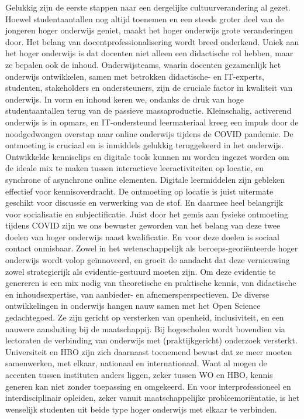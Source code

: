 \documentclass{jote-book}
\begin{document}
	Gelukkig zijn de eerste stappen naar een dergelijke cultuurverandering al gezet. Hoewel studentaantallen nog altijd toenemen en een steeds groter deel van de jongeren hoger onderwijs geniet, maakt het hoger onderwijs grote veranderingen door. Het belang van docentprofessionalisering wordt breed onderkend. Uniek aan het hoger onderwijs is dat docenten niet alleen een didactische rol hebben, maar ze bepalen ook de inhoud. Onderwijsteams, waarin docenten gezamenlijk het onderwijs ontwikkelen, samen met betrokken didactische- en IT-experts, studenten, stakeholders en ondersteuners, zijn de cruciale factor in kwaliteit van onderwijs. In vorm en inhoud keren we, ondanks de druk van hoge studentaantallen terug van de passieve massaproductie. Kleinschalig, activerend onderwijs is in opmars, en IT-ondersteund leermateriaal kreeg een impuls door de noodgedwongen overstap naar online onderwijs tijdens de COVID pandemie. De ontmoeting is cruciaal en is inmiddels gelukkig teruggekeerd in het onderwijs. Ontwikkelde kennisclips en digitale tools kunnen nu worden ingezet worden om de ideale mix te maken tussen interactieve leeractiviteiten op locatie, en synchrone of asynchrone online elementen. Digitale leermiddelen zijn gebleken effectief voor kennisoverdracht. De ontmoeting op locatie is juist uitermate geschikt voor discussie en verwerking van de stof. En daarmee heel belangrijk voor socialisatie en subjectificatie. Juist door het gemis aan fysieke ontmoeting tijdens COVID zijn we ons bewuster geworden van het belang van deze twee doelen van hoger onderwijs naast kwalificatie. En voor deze doelen is sociaal contact onmisbaar. Zowel in het wetenschappelijk als beroeps-georiënteerde hoger onderwijs wordt volop geïnnoveerd, en groeit de aandacht dat deze vernieuwing zowel strategierijk als evidentie-gestuurd moeten zijn. Om deze evidentie te genereren is een mix nodig van theoretische en praktische kennis, van didactische en inhoudsexpertise, van aanbieder- en afnemersperspectieven. De diverse ontwikkelingen in onderwijs hangen nauw samen met het Open Science gedachtegoed. Ze zijn gericht op versterken van openheid, inclusiviteit, en een nauwere aansluiting bij de maatschappij. Bij hogescholen wordt bovendien via lectoraten de verbinding van onderwijs met (praktijkgericht) onderzoek versterkt. Universiteit en HBO zijn zich daarnaast toenemend bewust dat ze meer moeten samenwerken, met elkaar, nationaal en internationaal. Want al mogen de accenten tussen instituten anders liggen, zeker tussen WO en HBO, kennis generen kan niet zonder toepassing en omgekeerd. En voor interprofessioneel en interdisciplinair opleiden, zeker vanuit maatschappelijke probleemoriëntatie, is het wenselijk studenten uit beide type hoger onderwijs met elkaar te verbinden.
\end{document}
